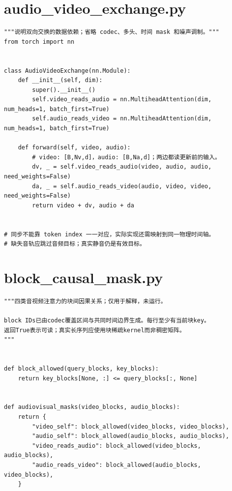 \section{audio\_video\_exchange.py}
\label{code-audio-video-exchange}
\begin{verbatim}
"""说明双向交换的数据依赖；省略 codec、多头、时间 mask 和噪声调制。"""
from torch import nn


class AudioVideoExchange(nn.Module):
    def __init__(self, dim):
        super().__init__()
        self.video_reads_audio = nn.MultiheadAttention(dim, num_heads=1, batch_first=True)
        self.audio_reads_video = nn.MultiheadAttention(dim, num_heads=1, batch_first=True)

    def forward(self, video, audio):
        # video: [B,Nv,d]，audio: [B,Na,d]；两边都读更新前的输入。
        dv, _ = self.video_reads_audio(video, audio, audio, need_weights=False)
        da, _ = self.audio_reads_video(audio, video, video, need_weights=False)
        return video + dv, audio + da


# 同步不能靠 token index 一一对应，实际实现还需映射到同一物理时间轴。
# 缺失音轨应跳过音频目标；真实静音仍是有效目标。
\end{verbatim}

\section{block\_causal\_mask.py}
\label{code-block-causal-mask}
\begin{verbatim}
"""四类音视频注意力的块间因果关系；仅用于解释，未运行。

block IDs已由codec覆盖区间与共同时间边界生成。每行至少有当前块key。
返回True表示可读；真实长序列应使用块稀疏kernel而非稠密矩阵。
"""


def block_allowed(query_blocks, key_blocks):
    return key_blocks[None, :] <= query_blocks[:, None]


def audiovisual_masks(video_blocks, audio_blocks):
    return {
        "video_self": block_allowed(video_blocks, video_blocks),
        "audio_self": block_allowed(audio_blocks, audio_blocks),
        "video_reads_audio": block_allowed(video_blocks, audio_blocks),
        "audio_reads_video": block_allowed(audio_blocks, video_blocks),
    }
\end{verbatim}


